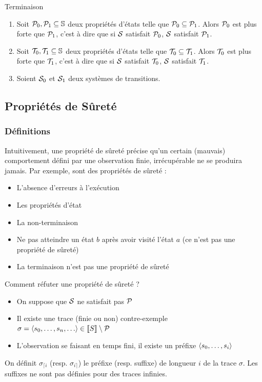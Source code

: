 \documentclass{cours}
\begin{document}
\begin{propositionfr}{Terminaison}{}
	\begin{enumerate}
		\item Soit $\mathcal{P}_{0}, \mathcal{P}_{1} \subseteq \mathbb{S}$ deux propriétés d'états telle que $\mathcal{P}_{0} \subseteq \mathcal{P}_{1}$. Alors $\mathcal{P}_{0}$ est plus forte que $\mathcal{P}_{1}$, c'est à dire que si $\mathcal{S}$ satisfait $\mathcal{P}_{0}$, $\mathcal{S}$ satisfait $\mathcal{P}_{1}$.
		\item Soit $\mathcal{T}_{0}, \mathcal{T}_{1} \subseteq \mathbb{S}$ deux propriétés d'états telle que $\mathcal{T}_{0} \subseteq \mathcal{T}_{1}$. Alors $\mathcal{T}_{0}$ est plus forte que $\mathcal{T}_{1}$, c'est à dire que si $\mathcal{S}$ satisfait $\mathcal{T}_{0}$, $\mathcal{S}$ satisfait $\mathcal{T}_{1}$.
		\item Soient $\mathcal{S}_{0}$ et $\mathcal{S}_{1}$ deux systèmes de transitions.
	\end{enumerate}
\end{propositionfr}

\subsection{Propriétés de Sûreté}
\subsubsection{Définitions}
Intuitivement, une propriété de sûreté précise qu'un certain (mauvais) comportement défini par une observation finie, irrécupérable ne se produira jamais. Par exemple, sont des propriétés de sûreté :
\begin{itemize}
	\item L'absence d'erreurs à l'exécution
	\item Les propriétés d'état
	\item La non-terminaison
	\item Ne pas atteindre un état $b$ après avoir visité l'état $a$ (ce n'est pas une propriété de sûreté)
	\item La terminaison n'est pas une propriété de sûreté
\end{itemize}
Comment réfuter une propriété de sûreté ?
\begin{itemize}
	\item On suppose que $\mathcal{S}$ ne satisfait pas $\mathcal{P}$
	\item Il existe une trace  (finie ou non) contre-exemple $\sigma = \left\langle s_{0}, \ldots, s_{n}, \ldots \right\rangle \in \left\llbracket S \right\rrbracket\setminus \mathcal{P}$
	\item L'observation se faisant en temps fini, il existe un préfixe $\left\langle s_{0}, \ldots, s_{i} \right\rangle$
\end{itemize}
On définit $\sigma_{\lceil i}$ (resp. $\sigma_{i \rceil}$) le préfixe (resp. suffixe) de longueur $i$ de la trace $\sigma$. Les suffixes ne sont pas définies pour des traces infinies.
\end{document}
